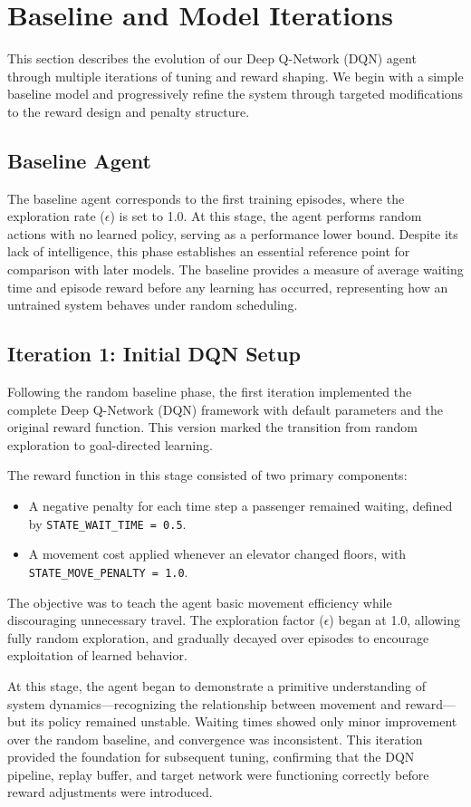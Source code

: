 \documentclass[conference]{IEEEtran}
\begin{document}
\section{Baseline and Model Iterations}
This section describes the evolution of our Deep Q-Network (DQN) agent through multiple iterations of tuning and reward shaping. We begin with a simple baseline model and progressively refine the system through targeted modifications to the reward design and penalty structure.

\subsection{Baseline Agent}
The baseline agent corresponds to the first training episodes, where the exploration rate ($\epsilon$) is set to 1.0. At this stage, the agent performs random actions with no learned policy, serving as a performance lower bound. Despite its lack of intelligence, this phase establishes an essential reference point for comparison with later models. The baseline provides a measure of average waiting time and episode reward before any learning has occurred, representing how an untrained system behaves under random scheduling.

\subsection{Iteration 1: Initial DQN Setup}
Following the random baseline phase, the first iteration implemented the complete Deep Q-Network (DQN) framework with default parameters and the original reward function. This version marked the transition from random exploration to goal-directed learning.

The reward function in this stage consisted of two primary components:
\begin{itemize}
    \item A negative penalty for each time step a passenger remained waiting, defined by \texttt{STATE\_WAIT\_TIME = 0.5}.
    \item A movement cost applied whenever an elevator changed floors, with \texttt{STATE\_MOVE\_PENALTY = 1.0}.
\end{itemize}
The objective was to teach the agent basic movement efficiency while discouraging unnecessary travel. The exploration factor ($\epsilon$) began at 1.0, allowing fully random exploration, and gradually decayed over episodes to encourage exploitation of learned behavior.

At this stage, the agent began to demonstrate a primitive understanding of system dynamics—recognizing the relationship between movement and reward—but its policy remained unstable. Waiting times showed only minor improvement over the random baseline, and convergence was inconsistent. This iteration provided the foundation for subsequent tuning, confirming that the DQN pipeline, replay buffer, and target network were functioning correctly before reward adjustments were introduced.
\end{document}
